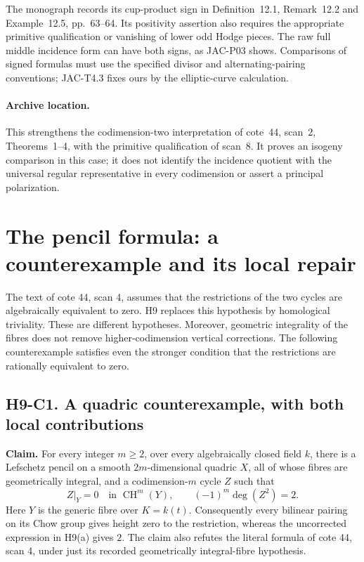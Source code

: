 \documentclass[11pt,a4paper]{article}
\begin{document}
The monograph records its cup-product sign in Definition~12.1,
Remark~12.2 and Example~12.5, pp.~63--64. Its positivity assertion
also requires the appropriate primitive qualification or vanishing
of lower odd Hodge pieces. The raw full middle incidence form can
have both signs, as JAC-P03 shows. Comparisons of signed formulas
must use the specified divisor and alternating-pairing conventions;
JAC-T4.3 fixes ours by the elliptic-curve calculation.

\paragraph{Archive location.}
This strengthens the codimension-two interpretation of cote~44,
scan~2, Theorems~1--4, with the primitive qualification of scan~8.
It proves an isogeny comparison in this case; it does not identify
the incidence quotient with the universal regular representative in
every codimension or assert a principal polarization.



\section{The pencil formula: a counterexample and its local repair}

The text of cote 44, scan 4, assumes that the restrictions of the two
cycles are algebraically equivalent to zero. H9 replaces this hypothesis by
homological triviality. These are different hypotheses. Moreover, geometric
integrality of the fibres does not remove higher-codimension vertical
corrections. The following counterexample satisfies even the stronger
condition that the restrictions are rationally equivalent to zero.

\subsection*{H9-C1. A quadric counterexample, with both local contributions}

\textbf{Claim.} For every integer $m\geq2$, over every algebraically closed
field $k$, there is a
Lefschetz pencil on a smooth $2m$-dimensional quadric $X$, all of whose fibres
are geometrically integral, and a codimension-$m$ cycle $Z$ such that
\[
 Z|_{Y}=0\quad\text{in }\operatorname{CH}^{m}(Y),\qquad
 (-1)^m\deg(Z^2)=2.
\]
Here $Y$ is the generic fibre over $K=k(t)$. Consequently every
bilinear pairing on its Chow group gives height zero to the restriction,
whereas the uncorrected expression in H9(a) gives $2$. The claim also
refutes the literal formula of cote 44, scan 4, under just its recorded
geometrically integral-fibre hypothesis.
\end{document}
